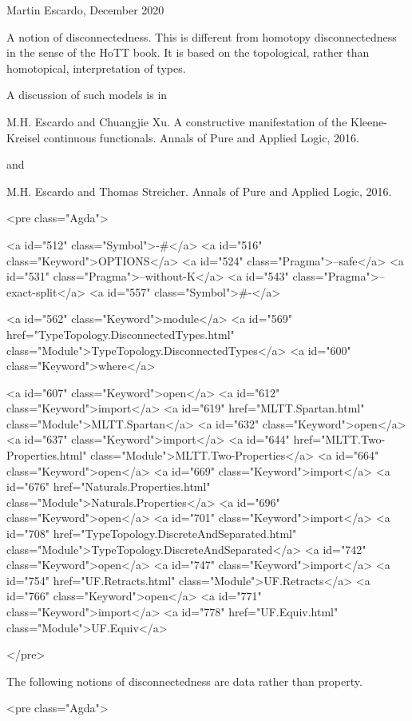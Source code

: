 Martin Escardo, December 2020

A notion of disconnectedness. This is different from homotopy
disconnectedness in the sense of the HoTT book. It is based on the
topological, rather than homotopical, interpretation of types.

A discussion of such models is in

  M.H. Escardo and Chuangjie Xu. A constructive manifestation of the
  Kleene-Kreisel continuous functionals. Annals of Pure and Applied
  Logic, 2016.

and

  M.H. Escardo and Thomas Streicher. Annals of Pure and Applied Logic,
  2016.

<pre class="Agda">

<a id="512" class="Symbol">{-#</a> <a id="516" class="Keyword">OPTIONS</a> <a id="524" class="Pragma">--safe</a> <a id="531" class="Pragma">--without-K</a> <a id="543" class="Pragma">--exact-split</a> <a id="557" class="Symbol">#-}</a>

<a id="562" class="Keyword">module</a> <a id="569" href="TypeTopology.DisconnectedTypes.html" class="Module">TypeTopology.DisconnectedTypes</a> <a id="600" class="Keyword">where</a>

<a id="607" class="Keyword">open</a> <a id="612" class="Keyword">import</a> <a id="619" href="MLTT.Spartan.html" class="Module">MLTT.Spartan</a>
<a id="632" class="Keyword">open</a> <a id="637" class="Keyword">import</a> <a id="644" href="MLTT.Two-Properties.html" class="Module">MLTT.Two-Properties</a>
<a id="664" class="Keyword">open</a> <a id="669" class="Keyword">import</a> <a id="676" href="Naturals.Properties.html" class="Module">Naturals.Properties</a>
<a id="696" class="Keyword">open</a> <a id="701" class="Keyword">import</a> <a id="708" href="TypeTopology.DiscreteAndSeparated.html" class="Module">TypeTopology.DiscreteAndSeparated</a>
<a id="742" class="Keyword">open</a> <a id="747" class="Keyword">import</a> <a id="754" href="UF.Retracts.html" class="Module">UF.Retracts</a>
<a id="766" class="Keyword">open</a> <a id="771" class="Keyword">import</a> <a id="778" href="UF.Equiv.html" class="Module">UF.Equiv</a>

</pre>

The following notions of disconnectedness are data rather than
property.

<pre class="Agda">

